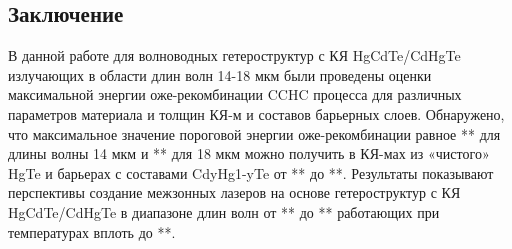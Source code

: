 \documentclass[../main.tex]{subfiles}
\begin{document}
    \begin{center}
        \subsection{Заключение}
    \end{center}

    В данной работе для волноводных гетероструктур с КЯ HgCdTe/CdHgTe излучающих в области длин волн 14-18 мкм были проведены оценки максимальной
    энергии оже-рекомбинации CCHC процесса для различных параметров материала и толщин КЯ-м и составов барьерных слоев. Обнаружено, что 
    максимальное значение пороговой энергии оже-рекомбинации равное ** для длины волны 14 мкм и ** для 18 мкм можно получить в КЯ-мах из «чистого»  
    HgTe и барьерах с составами  CdyHg1-yTe от ** до **.  Результаты показывают перспективы создание межзонных лазеров на основе  гетероструктур с 
    КЯ HgCdTe/CdHgTe  в диапазоне длин волн от ** до ** работающих при температурах вплоть до **. 
\end{document}
